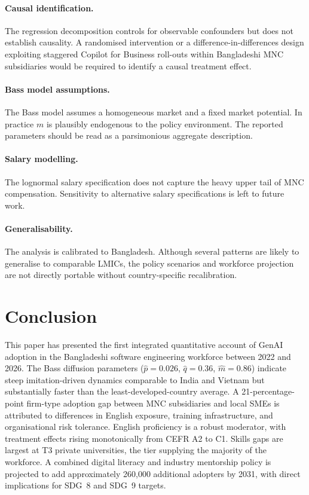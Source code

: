 \documentclass[11pt,a4paper]{article}
\begin{document}
\paragraph{Causal identification.}
The regression decomposition controls for observable confounders but
does not establish causality. A randomised intervention or a
difference-in-differences design exploiting staggered Copilot for
Business roll-outs within Bangladeshi MNC subsidiaries would be
required to identify a causal treatment effect.

\paragraph{Bass model assumptions.}
The Bass model assumes a homogeneous market and a fixed market
potential. In practice $m$ is plausibly endogenous to the policy
environment. The reported parameters should be read as a parsimonious
aggregate description.

\paragraph{Salary modelling.}
The lognormal salary specification does not capture the heavy upper
tail of MNC compensation. Sensitivity to alternative salary
specifications is left to future work.

\paragraph{Generalisability.}
The analysis is calibrated to Bangladesh. Although several patterns
are likely to generalise to comparable LMICs, the policy scenarios
and workforce projection are not directly portable without
country-specific recalibration.

\section{Conclusion}

This paper has presented the first integrated quantitative account
of GenAI adoption in the Bangladeshi software engineering workforce
between 2022 and 2026. The Bass diffusion parameters ($\hat{p}=0.026$,
$\hat{q}=0.36$, $\hat{m}=0.86$) indicate steep imitation-driven
dynamics comparable to India and Vietnam but substantially faster
than the least-developed-country average. A 21-percentage-point
firm-type adoption gap between MNC subsidiaries and local SMEs is
attributed to differences in English exposure, training
infrastructure, and organisational risk tolerance. English proficiency
is a robust moderator, with treatment effects rising monotonically
from CEFR A2 to C1. Skills gaps are largest at T3 private
universities, the tier supplying the majority of the workforce. A
combined digital literacy and industry mentorship policy is projected
to add approximately 260{,}000 additional adopters by 2031, with
direct implications for SDG~8 and SDG~9 targets.
\end{document}
